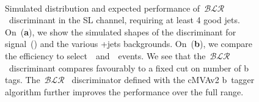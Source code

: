 \begin{figure}
\begin{centering}
\\
\caption[Expected performance of the b-tag likelihood ratio discriminant.]{Simulated distribution and expected performance of~$\mathcal{BLR}$~discriminant in the SL channel, requiring at least 4 good jets. On~(\textbf{a}), we show the simulated shapes of the discriminant for signal~(\ttHbb) and the various \ttbar+jets backgrounds. On~(\textbf{b}), we compare the efficiency to select~\ttHbb~and~\ttlf~events. We see that the~$\mathcal{BLR}$~discriminant compares favourably to a fixed cut on number of b tags. The~$\mathcal{BLR}$~ discriminator defined with the cMVAv2 b~tagger algorithm further improves the performance over the full range.}
\label{fig:blr_discrimination}
\end{centering}
\end{figure}


